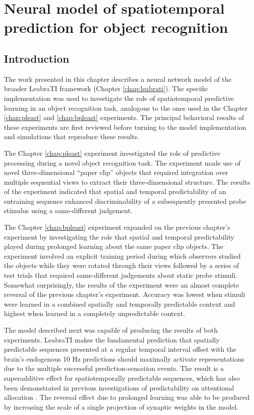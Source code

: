 \documentclass[dwyatte_dissertation.tex]{subfiles}
\begin{document}
\sloppy

\chapter{Neural model of spatiotemporal prediction for object recognition}

\section{Introduction}
The work presented in this chapter describes a neural network model of the broader LeabraTI framework (Chapter \ref{chap:leabrati}). The specific implementation was used to investigate the role of spatiotemporal predictive learning in an object recognition task, analogous to the ones used in the Chapter \ref{chap:pleast} and \ref{chap:bpleast} experiments. The principal behavioral results of these experiments are first reviewed before turning to the model implementation and simulations that reproduce these results.

The Chapter \ref{chap:pleast} experiment investigated the role of predictive processing during a novel object recognition task. The experiment made use of novel three-dimensional ``paper clip'' objects that required integration over multiple sequential views to extract their three-dimensional structure. The results of the experiment indicated that spatial and temporal predictability of an entraining sequence enhanced discriminability of a subsequently presented probe stimulus using a same-different judgement.

The Chapter \ref{chap:bpleast} experiment expanded on the previous chapter's experiment by investigating the role that spatial and temporal predictability played during prolonged learning about the same paper clip objects. The experiment involved an explicit training period during which observers studied the objects while they were rotated through their views followed by a series of test trials that required same-different judgements about static probe stimuli. Somewhat surprisingly, the results of the experiment were an almost complete reversal of the previous chapter's experiment. Accuracy was lowest when stimuli were learned in a combined spatially and temporally predictable context and highest when learned in a completely unpredictable context.

The model described next was capable of producing the results of both experiments. LeabraTI makes the fundamental prediction that spatially predictable sequences presented at a regular temporal interval offset with the brain's endogenous 10 Hz predictions should maximally activate representations due to the multiple successful prediction-sensation events. The result is a superadditive effect for spatiotemporally predictable sequences, which has also been demonstrated in previous investigations of predictability on attentional allocation \cite{DohertyRaoMesulamEtAl05,RohenkohlGouldPessoaEtAl14}. The reversal effect due to prolonged learning was able to be produced by increasing the scale of a single projection of synaptic weights in the model. 
\end{document}
